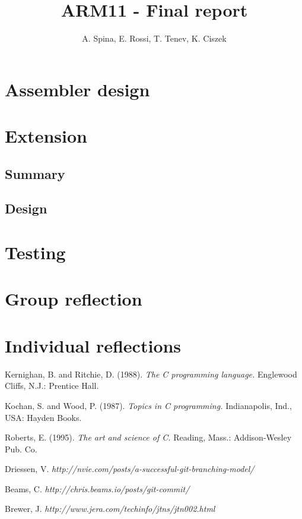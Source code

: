 \documentclass[11pt]{article}
\begin{document}
\title{ARM11 - Final report}
\author{A. Spina, E. Rossi, T. Tenev, K. Ciszek}

\maketitle

\section{Assembler design}

\section{Extension}

\subsection{Summary}

\subsection{Design}

\section{Testing}

\section{Group reflection}

\section{Individual reflections}

\medskip

\begin{thebibliography}{7}

Kernighan, B. and Ritchie, D. (1988).
\textit{The C programming language.}
Englewood Cliffs, N.J.: Prentice Hall.

Kochan, S. and Wood, P. (1987).
\textit{Topics in C programming.}
Indianapolis, Ind., USA: Hayden Books.
 
Roberts, E. (1995).
\textit{The art and science of C.}
Reading, Mass.: Addison-Wesley Pub. Co.

Driessen, V.
\textit{http://nvie.com/posts/a-successful-git-branching-model/}

Beams, C.
\textit{http://chris.beams.io/posts/git-commit/}

Brewer, J.
\textit{http://www.jera.com/techinfo/jtns/jtn002.html}

\end{thebibliography}
\end{document}
